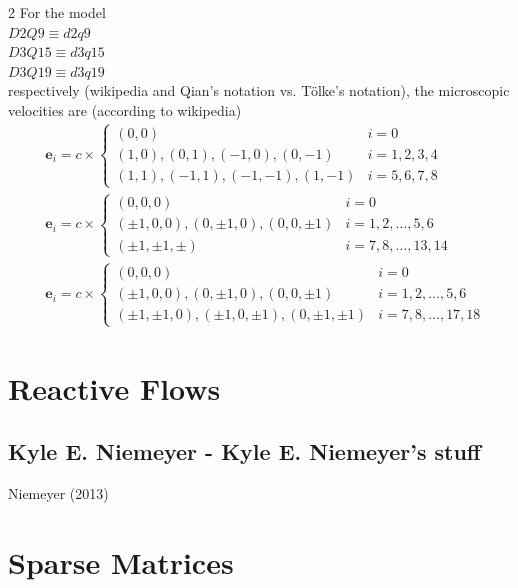 \documentclass[10pt]{amsart}
\begin{document}
\begin{multicols*}{2}
For the model \\
$D2Q9 \equiv d2q9$ \\
$D3Q15 \equiv d3q15$ \\
$D3Q19 \equiv d3q19$ \\
respectively (wikipedia and Qian's notation vs. T\"{o}lke's notation), the microscopic velocities are (according to wikipedia)
\begin{equation}
\begin{aligned}
&  \mathbf{e}_i = c \times \begin{cases} (0,0) & i = 0 \\
    (1,0),(0,1),(-1,0),(0,-1) & i = 1,2,3,4 \\
    (1,1),(-1,1), (-1,-1), (1,-1) & i = 5,6,7,8 \end{cases} \\
&  \mathbf{e}_i = c \times \begin{cases} (0,0,0) & i = 0 \\
    (\pm 1,0,0), (0, \pm 1, 0), (0,0,\pm 1) & i = 1,2, \dots, 5,6 \\
    (\pm 1, \pm 1, \pm ) & i = 7,8, \dots, 13,14 \end{cases} \\
&  \mathbf{e}_i = c \times \begin{cases} (0,0,0) & i = 0 \\
    (\pm 1, 0, 0) , (0, \pm 1, 0), (0,0 , \pm 1) & i = 1,2, \dots , 5, 6 \\
    (\pm 1, \pm 1 ,0), (\pm 1, 0, \pm 1), (0, \pm 1, \pm 1) & i = 7, 8 , \dots, 17, 18 \end{cases}
  \end{aligned}
  \end{equation}



\section{Reactive Flows}

\subsection{Kyle E. Niemeyer - Kyle E. Niemeyer's stuff}

Niemeyer (2013) \cite{NiSu2013}

\section{Sparse Matrices}


\end{multicols*}
\end{document}
